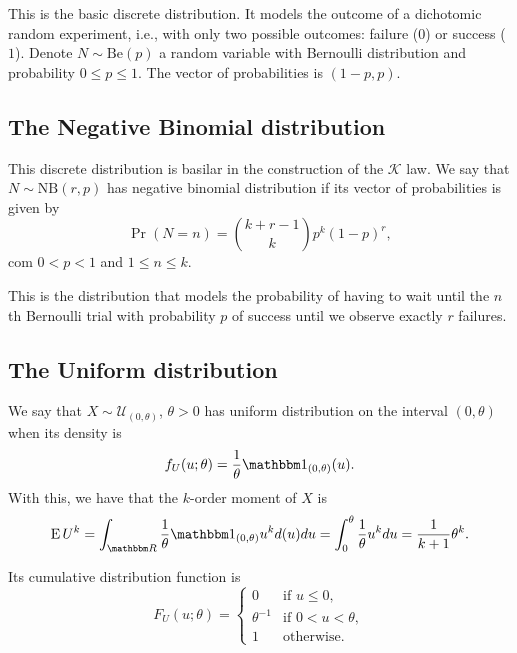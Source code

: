 This is the basic discrete distribution.
It models the outcome of a dichotomic random experiment, i.e., with only two possible outcomes: failure ($0$) or success ($1$).
Denote $N\sim\text{Be}(p)$ a random variable with Bernoulli distribution and probability $0\leq p\leq 1$.
The vector of probabilities is $(1-p,p)$.

\subsection{The Negative Binomial distribution}\label{Sec:NegativeBinomial}

This discrete distribution is basilar in the construction of the $\mathcal K$ law.
We say that $N\sim\text{NB}(r,p)$ has negative binomial distribution if its vector of probabilities is given by
$$
\Pr(N=n) = {{k+r-1}\choose{k}} p^k (1-p)^r,
$$
com $0<p<1$ and $1\leq n\leq k$.

This is the distribution that models the probability of having to wait until the $n$th Bernoulli trial with probability $p$ of success until we observe exactly $r$ failures.

\subsection{The Uniform distribution}
We say that $X\sim\mathcal U_{(0,\theta)}$, $\theta>0$ has uniform distribution on the interval $(0,\theta)$ when its density is
\begin{equation}
f_U(u;\theta) = \frac{1}{\theta} \mathbbm 1_{(0,\theta)} (u).
\label{eq:DensUniform}
\end{equation}
With this, we have that the $k$-order moment of $X$ is
\begin{equation}
\operatorname{E}U^k = \int_{\mathbbm R}\frac{1}{\theta} \mathbbm 1_{(0,\theta)} u^k d(u) du = 
\int_{0}^{\theta} \frac1\theta u^k du = 
\frac{1}{k+1} \theta^k.
\label{eq:MomentsUniform}
\end{equation}

Its cumulative distribution function is
\begin{equation}
F_U(u;\theta) = 
	\begin{cases}
	0 				& \text{if } u\leq 0,\\
	\theta^{-1} 	& \text{if } 0< u < \theta,\\
	1 				& \text{otherwise.}
	\end{cases}
\label{eq:CDFUniform}
\end{equation}

